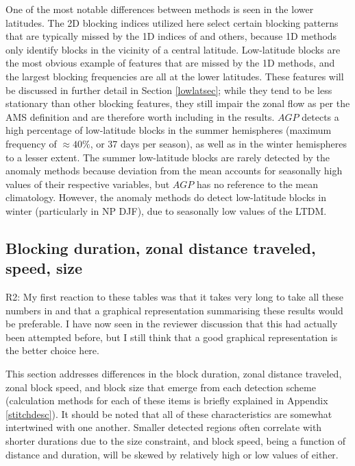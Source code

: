 \documentclass[smallextended]{svjour3}       %
\numberwithin{equation}{section}
\begin{document}
One of the most notable differences between methods is seen in the lower latitudes. The 2D blocking indices utilized here select certain blocking patterns that are typically missed by the 1D indices of \cite{tibaldi_operational_1990} and others, because  1D methods only identify blocks in the vicinity of a central latitude. Low-latitude blocks are the most obvious example of features that are missed by the 1D methods, and the largest blocking frequencies are all at the lower latitudes. These features will be discussed in further detail in Section \ref{lowlatsec}; while they tend to be less stationary than other blocking features, they still impair the zonal flow as per the AMS definition and are therefore worth including in the results. $AGP$ detects a high percentage of low-latitude blocks in the summer hemispheres (maximum frequency of $\approx 40\%$, or 37 days per season), as well as in the winter hemispheres to a lesser extent. The summer low-latitude blocks are rarely detected by the anomaly methods because deviation from the mean accounts for seasonally high values of their respective variables, but $AGP$ has no reference to the mean climatology. However, the anomaly methods do detect low-latitude blocks in winter (particularly in NP DJF), due to seasonally low values of the LTDM.


\subsection{Blocking duration, zonal distance traveled, speed, size}\label{blockingmetrics}

{\color{teal}R2: My first reaction to these tables was that it takes very long to take all these numbers in and that a graphical representation summarising these results would be preferable. I have now seen in the reviewer discussion that this had actually been attempted before, but I still think that a good graphical representation is the better choice here.}

This section addresses differences in the block duration, zonal distance traveled, zonal block speed, and block size that emerge from each detection scheme (calculation methods for each of these items is briefly explained in Appendix \ref{stitchdesc}).  It should be noted that all of these characteristics are somewhat intertwined with one another. Smaller detected regions often correlate with shorter durations due to the size constraint, and block speed, being a function of distance and duration, will be skewed by relatively high or low values of either. 
\end{document}
